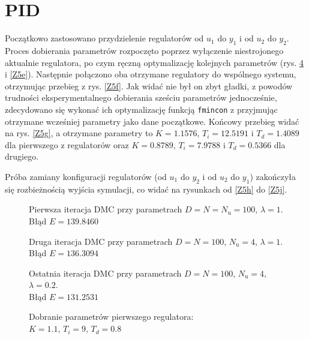 \section{PID}
Początkowo zastosowano przydzielenie regulatorów od $ u_1 $ do $ y_1 $ i od $ u_2 $ do $ y_2 $. Proces dobierania parametrów rozpoczęto poprzez wyłączenie niestrojonego aktualnie regulatora, po czym ręczną optymalizację kolejnych parametrów (rys. \ref{Z5d} i \ref{Z5e}). Następnie połączono oba otrzymane regulatory do wspólnego systemu, otrzymując przebieg z rys. \ref{Z5f}. Jak widać nie był on zbyt gładki, z powodów trudności eksperymentalnego dobierania sześciu parametrów jednocześnie, zdecydowano się wykonać ich optymalizację funkcją \verb|fmincon| z przyjmując otrzymane wcześniej parametry jako dane początkowe. Końcowy przebieg widać na rys. \ref{Z5g}, a otrzymane parametry to $ K=\num{1,1576} $, $ T_i=\num{12,5191} $ i $ T_d=\num{1,4089} $ dla pierwszego z regulatorów oraz $ K=\num{0,8789} $, $ T_i=\num{7,9788} $ i $ T_d=\num{0,5366} $ dla drugiego.

Próba zamiany konfiguracji regulatorów (od $ u_1 $ do $ y_2 $ i od $ u_2 $ do $ y_1 $) zakończyła się rozbieżnością wyjścia symulacji, co widać na rysunkach od \ref{Z5h} do \ref{Z5j}.



\begin{figure}[ht]
\centering

\caption{Pierwsza iteracja DMC przy parametrach $ D=N=N_\mathrm{u}=100$, $\lambda=1$. \\Błąd $ E=\num{139,8460} $}
\label{Z5a}
\end{figure}

\begin{figure}[ht]
\centering

\caption{Druga iteracja DMC przy parametrach $ D=N=100$, $ N_\mathrm{u}=4 $, $\lambda=1$. \\Błąd $ E=\num{136,3094} $}
\label{Z5b}
\end{figure}

\begin{figure}[ht]
\centering

\caption{Ostatnia iteracja DMC przy parametrach $ D=N=100$, $ N_\mathrm{u}=4 $, $\lambda=\num{0,2}$. \\Błąd $ E=\num{131.2531} $}
\label{Z5c}
\end{figure}

\begin{figure}[ht]
\centering

\caption{Dobranie parametrów pierwszego regulatora:\\
$ K=\num{1,1} $, $ T_i=\num{9} $, $ T_d=\num{0,8} $}
\label{Z5d}
\end{figure}


